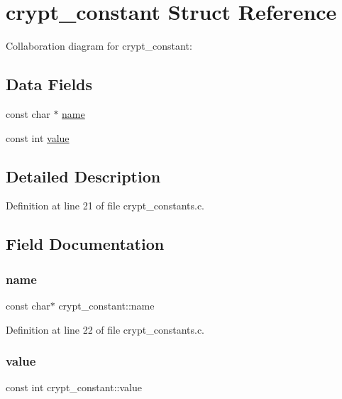 \hypertarget{structcrypt__constant}{}\section{crypt\+\_\+constant Struct Reference}
\label{structcrypt__constant}


Collaboration diagram for crypt\+\_\+constant\+:
\subsection*{Data Fields}
\begin{DoxyCompactItemize}
\item 
const char $\ast$ \mbox{\hyperlink{structcrypt__constant_a7ac8f108200fe438828f18894fd04c60}{name}}
\item 
const int \mbox{\hyperlink{structcrypt__constant_ab8039d42f9c5a5623cace3a353139993}{value}}
\end{DoxyCompactItemize}


\subsection{Detailed Description}


Definition at line 21 of file crypt\+\_\+constants.\+c.



\subsection{Field Documentation}
\mbox{\label{structcrypt__constant_a7ac8f108200fe438828f18894fd04c60}} 
\subsubsection{\texorpdfstring{name}{name}}
{\footnotesize\ttfamily const char$\ast$ crypt\+\_\+constant\+::name}



Definition at line 22 of file crypt\+\_\+constants.\+c.

\mbox{\label{structcrypt__constant_ab8039d42f9c5a5623cace3a353139993}} 
\subsubsection{\texorpdfstring{value}{value}}
{\footnotesize\ttfamily const int crypt\+\_\+constant\+::value}




